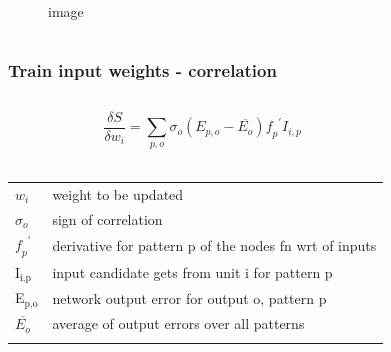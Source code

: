 \documentclass[presentation]{beamer}
\begin{document}
\begin{frame}
\begin{columns}[t]
\begin{column}{0.5\textwidth}
\begin{figure}
        \caption{image}
      \end{figure}			
		\end{column}
	\end{columns}
\end{frame}


\begin{frame}
  \frametitle{Train input weights - correlation}
	\begin{columns}[t]
		\begin{column}{0.5\textwidth}
      $$ \frac{\delta S}{\delta w_{i}} = \sum_{p,o} \sigma_{o}(E_{p,o} - \overline{E_{o}}) \mathit{f_{p}}^{\prime} I_{i,p} $$
     \\ 
      \begin{center}
        \begin{tabular}{ll}
          \(\mathit{w_{i}}\) & \tiny{weight to be updated}  \\
          \(\sigma_{o}\) & \tiny{sign of correlation}  \\
          \(\mathit{f_{p}}^{\prime}\) & \tiny{derivative for pattern p of the nodes fn wrt of inputs} \\
          I\(_{\text{i,p}}\) & \tiny{input candidate gets from unit i for pattern p}  \\
          E\(_{\text{p,o}}\) & \tiny{network output error for output o, pattern p} \\
          \(\overline{E_{o}}\) & \tiny{average of output errors over all patterns} \\
          & \\
        \end{tabular}
      \end{center}
		\end{column}
		\begin{column}{0.5\textwidth}
      \begin{figure}
        \centering

\end{figure}
\end{column}
\end{columns}
\end{frame}
\end{document}
